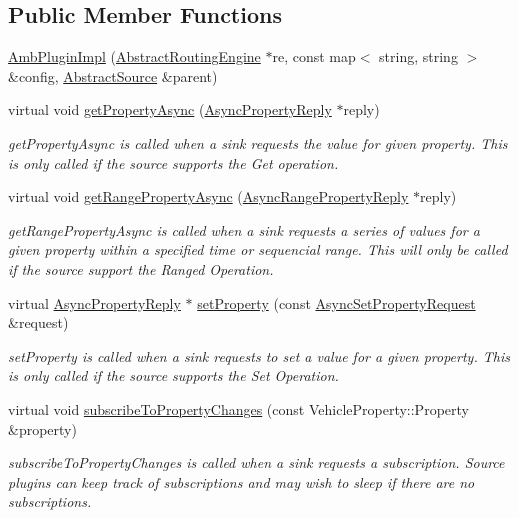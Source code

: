 \subsection*{Public Member Functions}
\begin{DoxyCompactItemize}
\item 
\hyperlink{classAmbPluginImpl_a3d8f1cc299086979feda83a738383da9}{Amb\+Plugin\+Impl} (\hyperlink{classAbstractRoutingEngine}{Abstract\+Routing\+Engine} $\ast$re, const map$<$ string, string $>$ \&config, \hyperlink{classAbstractSource}{Abstract\+Source} \&parent)
\item 
virtual void \hyperlink{classAmbPluginImpl_a5d8761396425365968082d33858766ff}{get\+Property\+Async} (\hyperlink{classAsyncPropertyReply}{Async\+Property\+Reply} $\ast$reply)
\begin{DoxyCompactList}\small\item\em get\+Property\+Async is called when a sink requests the value for given property. This is only called if the source supports the Get operation. \end{DoxyCompactList}\item 
virtual void \hyperlink{classAmbPluginImpl_aed6dbea1334112647a1ea3929c63b974}{get\+Range\+Property\+Async} (\hyperlink{classAsyncRangePropertyReply}{Async\+Range\+Property\+Reply} $\ast$reply)
\begin{DoxyCompactList}\small\item\em get\+Range\+Property\+Async is called when a sink requests a series of values for a given property within a specified time or sequencial range. This will only be called if the source support the Ranged Operation. \end{DoxyCompactList}\item 
virtual \hyperlink{classAsyncPropertyReply}{Async\+Property\+Reply} $\ast$ \hyperlink{classAmbPluginImpl_a5f6fde74abdb780eeb2bd559622442db}{set\+Property} (const \hyperlink{classAsyncSetPropertyRequest}{Async\+Set\+Property\+Request} \&request)
\begin{DoxyCompactList}\small\item\em set\+Property is called when a sink requests to set a value for a given property. This is only called if the source supports the Set Operation. \end{DoxyCompactList}\item 
virtual void \hyperlink{classAmbPluginImpl_ac30b646ad031abf4242385a9036036f5}{subscribe\+To\+Property\+Changes} (const Vehicle\+Property\+::\+Property \&property)
\begin{DoxyCompactList}\small\item\em subscribe\+To\+Property\+Changes is called when a sink requests a subscription. Source plugins can keep track of subscriptions and may wish to sleep if there are no subscriptions. \end{DoxyCompactList}\item 

\end{DoxyCompactItemize}
